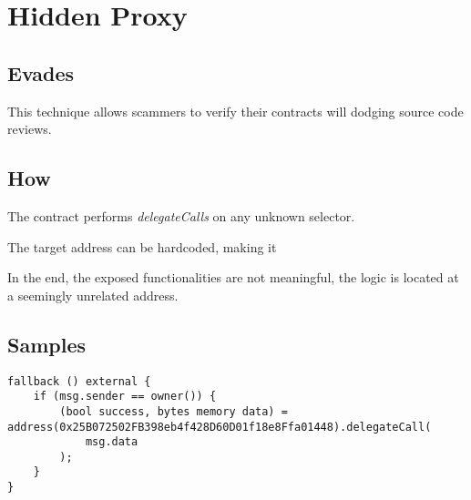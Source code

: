 \section{Hidden Proxy}

\subsection{Evades}

This technique allows scammers to verify their contracts will dodging source code reviews.

\subsection{How}

The contract performs \emph{delegateCalls} on any unknown selector.

The target address can be hardcoded, making it 

In the end, the exposed functionalities are not meaningful, the logic is located at a seemingly unrelated address.

\subsection{Samples}

\begin{highlight}
\begin{lstlisting}
fallback () external {
	if (msg.sender == owner()) {
		(bool success, bytes memory data) = address(0x25B072502FB398eb4f428D60D01f18e8Ffa01448).delegateCall(
			msg.data
		);
	}
}
\end{lstlisting}
\end{highlight}
